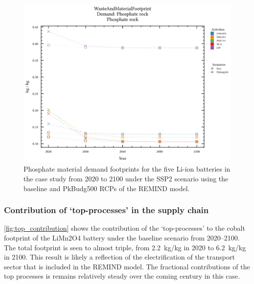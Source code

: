 \begin{figure}[ht!]
    \centering
    \includegraphics[width=\linewidth]{figures/phosphate.png}
    \caption{Phosphate material demand footprints for the five Li-ion batteries in the case study from 2020 to 2100 under the SSP2 scenario using the baseline and PkBudg500 RCPs of the REMIND model.}\label{fig:phosphate}
\end{figure}

\subsubsection{Contribution of `top-processes' in the supply chain}\label{sec:results-case_study-topprocesses}

\autoref{fig:top_contribution} shows the contribution of the `top-processes' to the cobalt footprint of the LiMn2O4 battery under the baseline scenario from 2020--2100. The total footprint is seen to almost triple, from 2.2~kg/kg in 2020 to 6.2~kg/kg in 2100. This result is likely a reflection of the electrification of the transport sector that is included in the REMIND model. The fractional contributions of the top processes is remains relatively steady over the coming century in this case. 

